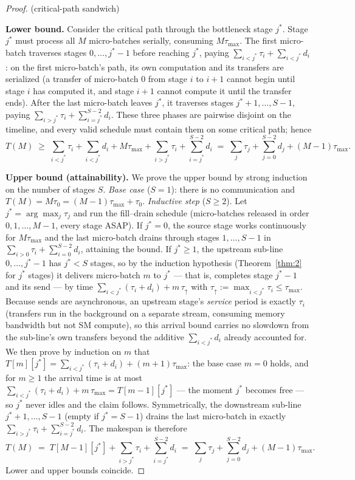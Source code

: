 \documentclass[11pt]{article}
\begin{document}
\begin{proof}(critical-path sandwich)

\textbf{Lower bound.} Consider the critical path through the bottleneck stage $j^*$. Stage $j^*$ must process all $M$ micro-batches serially, consuming $M\tau_{\max}$. The first micro-batch traverses stages $0,\dots,j^*-1$ before reaching $j^*$, paying $\sum_{i<j^*}\tau_i+\sum_{i<j^*}d_i$: on the first micro-batch's path, its own computation and its transfers are serialized (a transfer of micro-batch $0$ from stage $i$ to $i+1$ cannot begin until stage $i$ has computed it, and stage $i+1$ cannot compute it until the transfer ends). After the last micro-batch leaves $j^*$, it traverses stages $j^*+1,\dots,S-1$, paying $\sum_{i>j^*}\tau_i+\sum_{i=j^*}^{S-2}d_i$. These three phases are pairwise disjoint on the timeline, and every valid schedule must contain them on some critical path; hence
\[
T(M) \;\ge\; \sum_{i<j^*}\tau_i+\sum_{i<j^*}d_i + M\tau_{\max} + \sum_{i>j^*}\tau_i+\sum_{i=j^*}^{S-2}d_i
\;=\; \sum_j\tau_j + \sum_{j=0}^{S-2}d_j + (M-1)\tau_{\max}.
\]

\textbf{Upper bound (attainability).} We prove the upper bound by strong induction on the number of stages $S$. \emph{Base case} ($S=1$): there is no communication and $T(M)=M\tau_0=(M-1)\tau_{\max}+\tau_0$. \emph{Inductive step} ($S\ge2$). Let $j^*=\arg\max_j\tau_j$ and run the fill--drain schedule (micro-batches released in order $0,1,\dots,M-1$, every stage ASAP). If $j^*=0$, the source stage works continuously for $M\tau_{\max}$ and the last micro-batch drains through stages $1,\dots,S-1$ in $\sum_{i>0}\tau_i+\sum_{i=0}^{S-2}d_i$, attaining the bound. If $j^*\ge1$, the upstream sub-line $0,\dots,j^*-1$ has $j^*<S$ stages, so by the induction hypothesis (Theorem~\ref{thm:2} for $j^*$ stages) it delivers micro-batch $m$ to $j^*$ --- that is, completes stage $j^*-1$ and its send --- by time $\sum_{i<j^*}(\tau_i+d_i)+m\,\tau_{\uparrow}$ with $\tau_{\uparrow}:=\max_{i<j^*}\tau_i\le\tau_{\max}$. Because sends are asynchronous, an upstream stage's \emph{service} period is exactly $\tau_i$ (transfers run in the background on a separate stream, consuming memory bandwidth but not SM compute), so this arrival bound carries no slowdown from the sub-line's own transfers beyond the additive $\sum_{i<j^*}d_i$ already accounted for. We then prove by induction on $m$ that $T[m][j^*]=\sum_{i<j^*}(\tau_i+d_i)+(m+1)\tau_{\max}$: the base case $m=0$ holds, and for $m\ge1$ the arrival time is at most $\sum_{i<j^*}(\tau_i+d_i)+m\,\tau_{\max}=T[m-1][j^*]$ --- the moment $j^*$ becomes free --- so $j^*$ never idles and the claim follows. Symmetrically, the downstream sub-line $j^*+1,\dots,S-1$ (empty if $j^*=S-1$) drains the last micro-batch in exactly $\sum_{i>j^*}\tau_i+\sum_{i=j^*}^{S-2}d_i$. The makespan is therefore
\[
T(M) \;=\; T[M-1][j^*] + \sum_{i>j^*}\tau_i+\sum_{i=j^*}^{S-2}d_i
\;=\; \sum_j\tau_j+\sum_{j=0}^{S-2}d_j+(M-1)\tau_{\max}.
\]
Lower and upper bounds coincide.
\end{proof}
\end{document}
